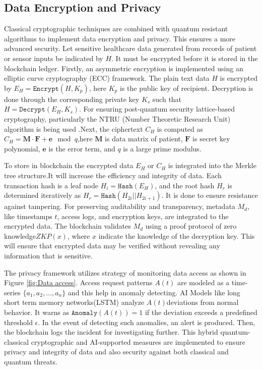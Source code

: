\documentclass[pdflatex,sn-mathphys-num]{sn-jnl}%
\theoremstyle{thmstyleone}%
\theoremstyle{thmstyletwo}%
\theoremstyle{thmstylethree}%
\begin{document}
\subsection{Data Encryption and Privacy}
Classical cryptographic techniques are combined with quantum resistant algorithms to implement data encryption and privacy. This ensures a more advanced security. Let sensitive healthcare data generated from records of patient  or sensor inputs be indicated by \( H \). It must be encrypted before it is stored in the blockchain ledger. Firstly, an asymmetric encryption is implemented using an elliptic curve cryptography (ECC) framework. The plain text data \( H \) is encrypted by \( E_H = \texttt{Encrypt}(H, K_p) \), here \( K_p \) is the public key of recipient. Decryption is done through the corresponding private key \( K_s \) such that \( H = \texttt{Decrypt}(E_H, K_s) \). For ensuring post-quantum security lattice-based cryptography, particularly the NTRU (Number Theoretic Research Unit) algorithm is being used \cite{bib18}.Next, the ciphertext \( C_H \) is computed as \( C_H = \mathbf{M} \cdot \mathbf{F} + \mathbf{e} \mod q \),here \( \mathbf{M} \) is data matrix of patient, \( \mathbf{F} \) is secret key polynomial, \( \mathbf{e} \) is the error term, and \( q \) is a large prime modulus.

To store in blockchain the encrypted data \( E_H \) or \( C_H \) is integrated into the Merkle tree structure.It will increase the efficiency and integrity of data. Each transaction hash is a leaf node \( H_i = \texttt{Hash}(E_H) \), and the root hash \( H_r \) is determined iteratively as \( H_r = \texttt{Hash}(H_{2i} || H_{2i+1}) \). It is done to ensure resistance against tampering. For preserving auditability and transparency, metadata \( M_d \), like timestamps \( t \), access logs, and encryption keys, are integrated to the encrypted data. The blockchain validates \( M_d \) using a  proof protocol of zero knowledge\( ZKP(x) \), where \( x \) indicate the knowledge of the decryption key. This will ensure that encrypted data may be verified without revealing any information that is sensitive.

The privacy framework utilizes strategy of monitoring data access as shown in Figure \ref{fig:Data access}. Access request patterns \( A(t) \) are modeled as a time-series \( \{a_1, a_2, \dots, a_n\} \) and this help in anomaly detecting. AI Models like long short term memory networks(LSTM) analyze \( A(t) \)deviations from normal behavior. It warns as \( \texttt{Anomaly}(A(t)) = 1 \) if the deviation exceeds a predefined threshold \( \epsilon \). In the event of detecting such anomalies, an alert is produced. Then, the blockchain logs the incident for investigating further. This hybrid quantum-classical cryptographic and AI-supported measures are implemented to ensure privacy and integrity of data and also security against both classical and quantum threats.
\end{document}
